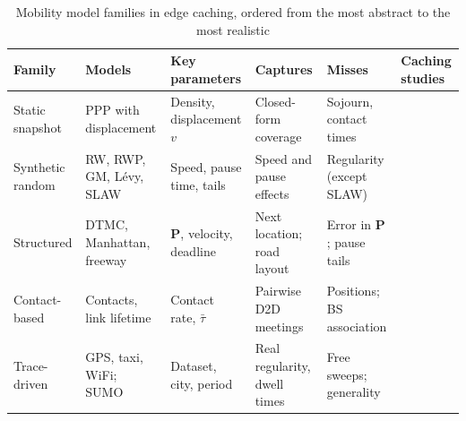 \begin{table}[t]
\centering
\caption{Mobility model families in edge caching, ordered from the most abstract to the most realistic}
\label{tab:models}
\footnotesize
\renewcommand{\arraystretch}{1.15}
\setlength{\tabcolsep}{1.8pt}
\def\citepunct{,\,}\def\citedash{--}%
\begin{tabular*}{\textwidth}{@{\extracolsep{\fill}}llllll@{}}
\hline
Family & Models & Key parameters & Captures & Misses & Caching studies \\
\hline
Static snapshot & PPP with displacement & Density, displacement $v$ & Closed-form coverage & Sojourn, contact times & \cite{krishnan2017mobility} \\
Synthetic random & RW, RWP, GM, L\'evy, SLAW & Speed, pause time, tails & Speed and pause effects & Regularity (except SLAW) & \cite{hosny2019performance} \\
Structured & DTMC, Manhattan, freeway & $\mathbf{P}$, velocity, deadline & Next location; road layout & Error in $\mathbf{P}$; pause tails & \cite{poularakis2013exploiting,poularakis2017code,ozfatura2020mobility,hosny2016allerton,alnagar2019city,alnagar2022mobility,wang2024markov,yu2021mobility} \\
Contact-based & Contacts, link lifetime & Contact rate, $\bar{\tau}$ & Pairwise D2D meetings & Positions; BS association & \cite{wang2017mobility,wang2018exploiting,jarray2016mobility} \\
Trace-driven & GPS, taxi, WiFi; SUMO & Dataset, city, period & Real regularity, dwell times & Free sweeps; generality & \cite{guan2014mobicacher,mahmood2019rich,wangq2022proactive,choi2023deep} \\
\hline
\end{tabular*}
\end{table}
